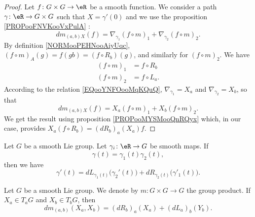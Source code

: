 \begin{proof}
	Let \(f \colon G\times G\to \eR  \) be a smooth function. We consider a path \(\gamma \colon \eR\to G\times G  \) such that \( X=\gamma'(0)\) and we use the proposition \ref{PROPooFNVKooVxPulA} :
	\begin{equation}
		dm_{(a,b)X}(f)=\nabla_{\gamma_1}(f\circ m)_1+\nabla_{\gamma_2}(f\circ m)_2.
	\end{equation}
	By definition \ref{NORMooPEHNooAiyUqc}, \( (f\circ m)_A(g)=f(gb)=(f\circ R_b)(g)\), and similarly for \( (f\circ m)_2\). We have
	\begin{subequations}
		\begin{align}
			(f\circ m)_1 & =f\circ R_b  \\
			(f\circ m)_2 & =f\circ L_a.
		\end{align}
	\end{subequations}
	According to the relation \eqref{EQooYNFOooMqKQuQ}, \( \nabla_{\gamma_1}=X_a\) and \( \nabla_{\gamma_2}=X_b\), so that
	\begin{equation}
		dm_{(a,b)X}(f)=X_a(f\circ m)_1+X_b(f\circ m)_2.
	\end{equation}
	We get the result using proposition \ref{PROPooMYSMooQnRQyx} which, in our case, provides \( X_a(f\circ R_b)=(dR_b)_a(X_a)f\).
\end{proof}


\begin{proposition}	\label{PROPooVMKQooRRztYF}
	Let \( G\) be a smooth Lie group. Let \(\gamma_i \colon \eR\to G  \) be smooth maps. If
	\begin{equation}
		\gamma(t)=\gamma_1(t)\gamma_2(t),
	\end{equation}
	then we have
	\begin{equation}
		\gamma'(t)=dL_{\gamma_1(t)}\big(\gamma_2'(t)\big)+dR_{\gamma_2(t)}\big(\gamma'_1(t)\big).
	\end{equation}
\end{proposition}

\begin{proposition}	\label{PROPooXCJXooYdoAqz}
	Let \( G\) be a smooth Lie group. We denote by \(m \colon G\times G\to G  \) the group product. If \( X_a\in T_aG\) and \( X_b\in T_bG\), then
	\begin{equation}
		dm_{(a,b)}(X_a,X_b)=(dR_b)_a(X_a)+(dL_a)_b(Y_b).
	\end{equation}
\end{proposition}

